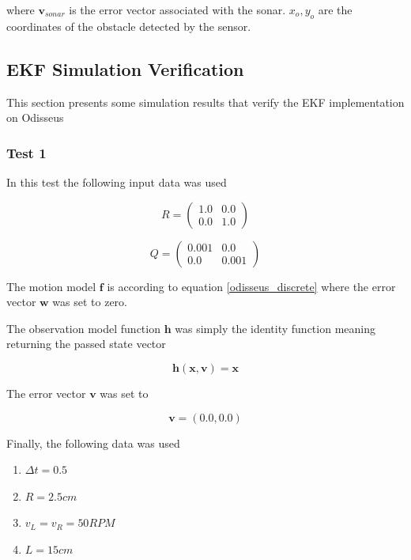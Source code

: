 where $\mathbf{v}_{sonar}$ is the error vector associated with the sonar. $x_o, y_o$ are the coordinates of the
obstacle detected by the sensor.


\subsection{EKF Simulation Verification}
This section presents some simulation results that verify the EKF implementation on Odisseus

\subsubsection{Test 1}

In this test the following input data was used

\begin{equation}
R = 
\begin{pmatrix}
 1.0 & 0.0 \\
0.0 & 1.0 
\end{pmatrix}
\end{equation}

\begin{equation}
Q = 
\begin{pmatrix}
0.001 & 0.0 \\
0.0 & 0.001 
\end{pmatrix}
\end{equation}

The motion model $\mathbf{f}$ is according to equation \ref{odisseus_discrete} where the error vector $\mathbf{w}$ was set to zero.

The observation model function $\mathbf{h}$ was simply the identity function meaning returning the passed state vector

\begin{equation}
\mathbf{h}(\mathbf{x}, \mathbf{v}) = \mathbf{x}
\end{equation}

The error vector $\mathbf{v}$ was set to

\begin{equation}
\mathbf{v} = (0.0, 0.0)
\end{equation}

Finally, the following data was used

\begin{enumerate}
	\item $\Delta t = 0.5$
	\item $R = 2.5 cm$
	\item $v_L = v_R = 50 RPM$
	\item $L= 15 cm$ 
\end{enumerate}



